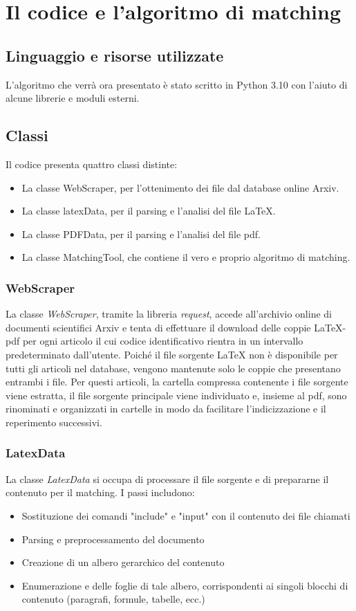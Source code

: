 \chapter{Il codice e l'algoritmo di matching}

\section{Linguaggio e risorse utilizzate}
	L'algoritmo che verrà ora presentato è stato scritto in Python 3.10 con l'aiuto di alcune librerie e moduli esterni.

\section{Classi}
	Il codice presenta quattro classi distinte:
	\begin{itemize}
		\item La classe WebScraper, per l'ottenimento dei file dal database online Arxiv.
		\item La classe latexData, per il parsing e l'analisi del file LaTeX.
		\item La classe PDFData, per il parsing e l'analisi del file pdf.
		\item La classe MatchingTool, che contiene il vero e proprio algoritmo di matching.
	\end{itemize}

	\subsection{WebScraper}
		La classe \textit{WebScraper}, tramite la libreria \textit{request}, accede all'archivio online di documenti scientifici Arxiv e tenta
		di effettuare il download delle coppie LaTeX-pdf per ogni articolo il cui codice identificativo rientra in un intervallo
		predeterminato dall'utente.
		Poiché il file sorgente LaTeX non è disponibile per tutti gli articoli nel database, vengono mantenute solo le 
		coppie che presentano entrambi i file. Per questi articoli, la cartella compressa contenente i file sorgente viene 
		estratta, il file sorgente principale viene individuato e, insieme al pdf, sono rinominati e organizzati in cartelle
		in modo da facilitare l'indicizzazione e il reperimento successivi.

	\subsection{LatexData}
		La classe \textit{LatexData} si occupa di processare il file sorgente e di prepararne il contenuto
		per il matching. I passi includono:
		\begin{itemize}
			\item Sostituzione dei comandi "include" e "input" con il contenuto dei file chiamati
			\item Parsing e preprocessamento del documento
			\item Creazione di un albero gerarchico del contenuto
			\item Enumerazione e delle foglie di tale albero, corrispondenti ai singoli blocchi di contenuto (paragrafi, formule, tabelle, ecc.)
		\end{itemize}

